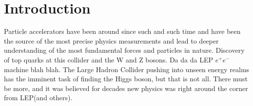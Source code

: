 \chapter{Introduction}

Particle accelerators have been around since such and such time and have been the source of the most precise physics measurements and lead to deeper understanding of the most fundamental forces and particles in nature.  Discovery of top quarks at this collider and the W and Z bosons.  Da da da LEP $e^+e^-$ machine blah blah.  The Large Hadron Collider pushing into unseen energy realms has the imminent task of finding the Higgs boson, but that is not all.  There must be more, and it was believed for decades new physics was right around the corner from LEP(and others).  

